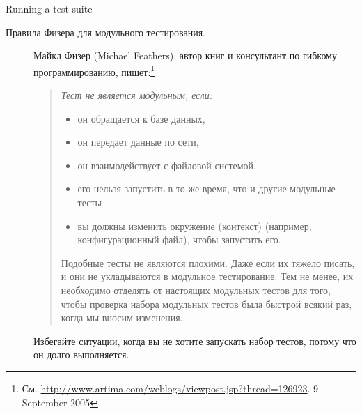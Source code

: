 \documentclass[a4paper,10pt,twoside]{book}
\begin{document}
\begin{method}[testsuiterun]{Running a test suite}
\begin{description}
\item[Правила Физера для модульного тестирования.]
Майкл Физер (Michael Feathers), автор книг и консультант по гибкому программированию, пишет:\footnote{См.    \url{http://www.artima.com/weblogs/viewpost.jsp?thread=126923}. 9 September 2005} 
  \begin{quotation}
  \noindent
  {\it
Тест не является модульным, если:
  \begin{itemize}
	\item он обращается к базе данных,	
	\item он передает данные по сети,	
	\item он взаимодействует с файловой системой,
	\item его нельзя запустить в то же время, что и другие модульные тесты	
	\item вы должны изменить окружение (контекст) (например, конфигурационный файл), чтобы запустить его.	
 \end{itemize}
Подобные тесты не являются плохими.
Даже если их тяжело писать, и они не укладываются в модульное тестирование.
Тем не менее, их необходимо отделять от настоящих модульных тестов для того, чтобы проверка набора модульных тестов была быстрой всякий раз, когда мы вносим изменения.
 }
  \end{quotation}
Избегайте ситуации, когда вы не хотите запускать набор тестов, потому что он долго выполняется.


\end{description}
\end{method}
\end{document}
